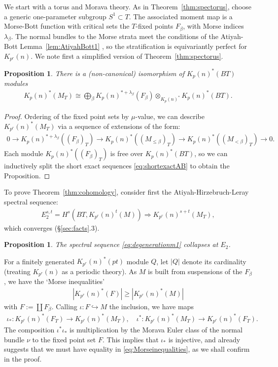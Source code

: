 \documentclass[11pt, reqno]{amsart}
\theoremstyle{plain}
\newtheorem{prop}[thm]{Proposition}
\theoremstyle{definition}
\begin{document}
We start with a torus and Morava theory. As in Theorem~\ref{thm:spectorus}, choose a generic 
one-parameter subgroup $S^1 \subset T$. The associated moment map is a Morse-Bott function 
with critical sets the $T$-fixed points  $F_\beta$, with Morse indices $\lambda_\beta$. 
The normal bundles to the Morse strata meet the conditions of the Atiyah-Bott Lemma~\ref{lem:AtiyahBott1} 
\cite{Atiyah}, so the stratification is equivariantly perfect for $K_{p^r}(n)$. We note first a 
simplified version of Theorem~\ref{thm:spectorus}.

\begin{prop} \label{lem:ABmomentcomponent}
There is a (non-canonical) isomorphism of $K_p(n)^*(BT)$ modules 
\begin{align} \label{eq:freenessofMorava} 
K_p(n)^*(M_T) \cong \bigoplus\nolimits_\beta K_p(n)^{*+\lambda_\beta}(F_\beta)\otimes_{K_p(n)^{*}} K_p(n)^*(BT).  
\end{align} 
\end{prop}
\begin{proof}  
Ordering of the fixed point 
sets by $\mu$-value,  we can describe $K_{p^r}(n)^*(M_T)$ via a sequence of extensions of the form: 
\begin{align} 
\label{eq:shortexactAB} 0 \to K_{p}(n)^{*+\lambda_\beta}((F_\beta)_T)\to 
	K_{p}(n)^*((M_{\leq \beta})_T)\to K_{p}(n)^*((M_{<\beta})_T)\to 0.  
\end{align}  
Each module  $K_{p}(n)^*((F_\beta)_T)$ is free over $K_p(n)^*(BT)$, so  we can inductively split the 
short exact sequences \eqref{eq:shortexactAB}  to obtain the Proposition.   
\end{proof} 

To prove Theorem~\ref{thm:cohomology}, consider first the Atiyah-Hirzebruch-Leray spectral sequence: 
\begin{align} 
\label{eq:degenerationm1} E_2^{s,t}= H^s(BT, K_{p^r}(n)^t(M)) \Rightarrow K_{p^r}(n)^{s+t}(M_T), 
\end{align}
which converges (\S\ref{sec:facts}.3).

\begin{prop} \label{prop:prMoravacircle} 
The  spectral sequence \eqref{eq:degenerationm1} collapses at $E_2$.    
\end{prop}
\noindent
For a finitely generated $K_{p^r}(n)^*(pt)$ module $Q$, let $|Q|$ denote its cardinality (treating 
$K_{p^r}(n)$ as a periodic theory).  As $M$ is built from suspensions of the $F_\beta$, we have the 
`Morse inequalities'
\begin{align} \label{eq:Morseinequalities} 
|K_{p^r}(n)^*(F)| \geq  |K_{p^r}(n)^*(M)| 
\end{align} 
with $F:= \coprod F_\beta$. Calling $\iota: F \hookrightarrow M$ the  inclusion, we have maps 
\begin{align} 
\iota_*: K_{p^r}(n)^*(F_T) \to K_{p^r}(n)^*(M_T),  \quad \iota^*: K_{p^r}(n)^*(M_{T}) \to K_{p^r}(n)^*(F_{T}).  
\end{align} 
The composition $ \iota^* \iota_*$ is multiplication by the Morava Euler class of the normal bundle $\nu$ 
to the fixed point set $F$. This implies that $\iota_*$ is injective, and already suggests that we 
must have equality in \eqref{eq:Morseinequalities}, as we shall confirm in 
the proof.
\end{document}
